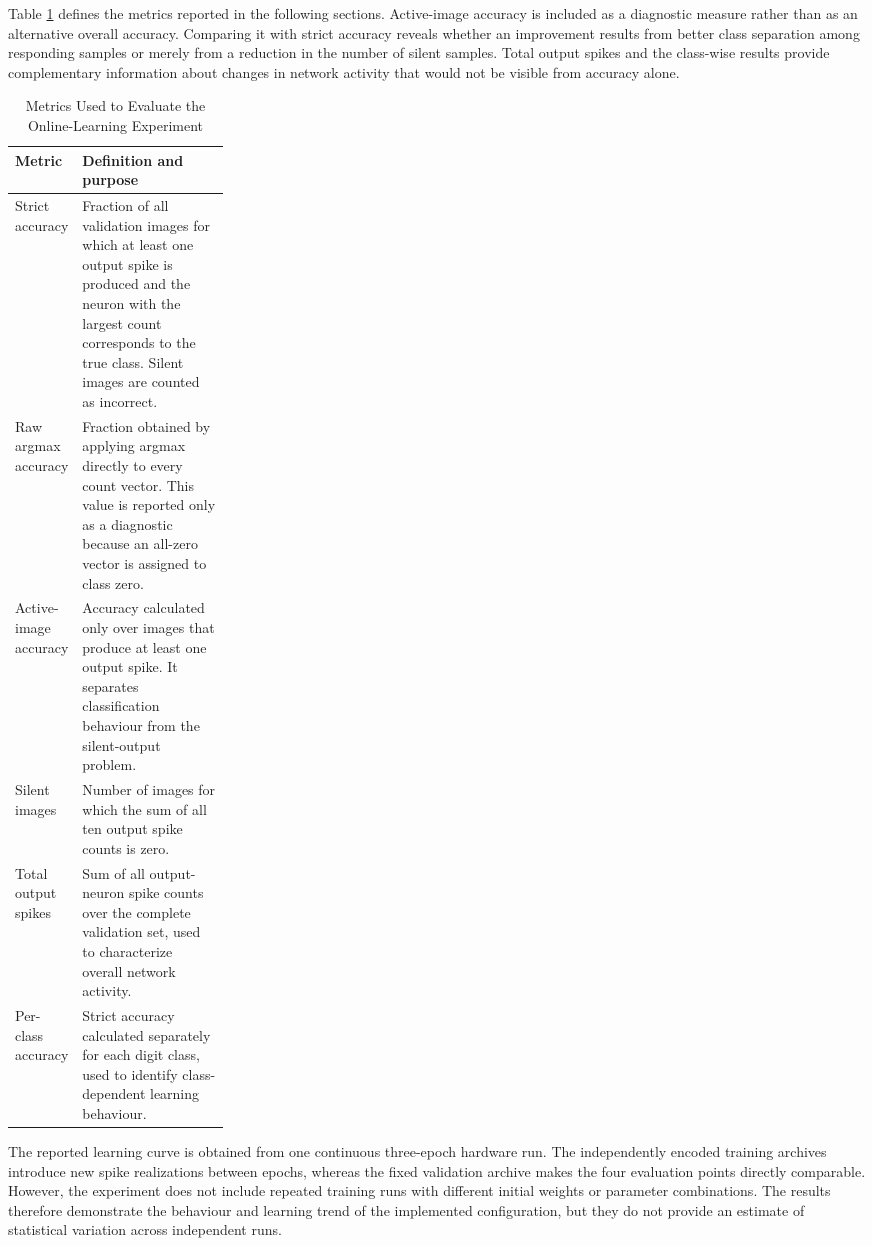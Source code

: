 Table \ref{tab:evaluation-metrics} defines the metrics reported in the following sections. Active-image accuracy is included as a diagnostic measure rather than as an alternative overall accuracy. Comparing it with strict accuracy reveals whether an improvement results from better class separation among responding samples or merely from a reduction in the number of silent samples. Total output spikes and the class-wise results provide complementary information about changes in network activity that would not be visible from accuracy alone.

\begin{table}[htbp]
	\centering
	\caption{Metrics Used to Evaluate the Online-Learning Experiment}
	\label{tab:evaluation-metrics}
	\small
	\begin{tabularx}{\linewidth}{@{}p{0.25\linewidth}X@{}}
		\toprule
		\textbf{Metric} & \textbf{Definition and purpose} \\
		\midrule
		Strict accuracy & Fraction of all validation images for which at least one output spike is produced and the neuron with the largest count corresponds to the true class. Silent images are counted as incorrect. \\
		Raw argmax accuracy & Fraction obtained by applying argmax directly to every count vector. This value is reported only as a diagnostic because an all-zero vector is assigned to class zero. \\
		Active-image accuracy & Accuracy calculated only over images that produce at least one output spike. It separates classification behaviour from the silent-output problem. \\
		Silent images & Number of images for which the sum of all ten output spike counts is zero. \\
		Total output spikes & Sum of all output-neuron spike counts over the complete validation set, used to characterize overall network activity. \\
		Per-class accuracy & Strict accuracy calculated separately for each digit class, used to identify class-dependent learning behaviour. \\
		\bottomrule
	\end{tabularx}
\end{table}

The reported learning curve is obtained from one continuous three-epoch hardware run. The independently encoded training archives introduce new spike realizations between epochs, whereas the fixed validation archive makes the four evaluation points directly comparable. However, the experiment does not include repeated training runs with different initial weights or parameter combinations. The results therefore demonstrate the behaviour and learning trend of the implemented configuration, but they do not provide an estimate of statistical variation across independent runs.

